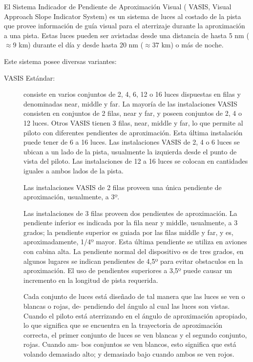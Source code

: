 El Sistema Indicador de Pendiente de Aproximación Visual ( VASIS, Visual
Approach Slope Indicator System) es un sistema de luces al costado de la pista que provee información
de guía visual para el aterrizaje durante la aproximación a una pista. Estas luces pueden ser avistadas
desde una distancia de hasta 5 nm ($\approx  9$ km) durante el día y desde hasta 20 nm ($\approx  37$ km) o más
de noche.

Este sistema posee diversas variantes:

\begin{description}

\item[VASIS Estándar:] consiste en varios conjuntos de 2, 4, 6, 12 o 16 luces dispuestas en filas y
denominadas near, middle y far. La mayoría de las instalaciones VASIS consisten en conjuntos
de 2 filas, near y far, y poseen conjuntos de 2, 4 o 12 luces. Otros VASIS tienen 3 filas, near,
middle y far, lo que permite al piloto con diferentes pendientes de aproximación. Esta última
instalación puede tener de 6 a 16 luces. Las instalaciones VASIS de 2, 4 o 6 luces se ubican a un
lado de la pista, usualmente la izquierda desde el punto de vista del piloto. Las instalaciones
de 12 a 16 luces se colocan en cantidades iguales a ambos lados de la pista.

Las instalaciones VASIS de 2 filas proveen una única pendiente de aproximación, usualmente,
a 3º.

Las instalaciones de 3 filas proveen dos pendientes de aproximación. La pendiente
inferior es indicada por la fila near y middle, usualmente, a 3 grados; la pendiente superior
es guiada por las filas middle y far, y es, aproximadamente, 1/4º mayor. Esta última
pendiente se utiliza en aviones con cabina alta. La pendiente normal del dispositivo es de tres
grados, en algunos lugares se indican pendientes de 4,5º para evitar obstaculos en la
aproximación. El uso de pendientes superiores a 3,5º puede causar un incremento en la
longitud de pista requerida.

Cada conjunto de luces está diseñado de tal manera que las luces se ven o blancas o rojas, de-
pendiendo del ángulo al cual las luces son vistas. Cuando el piloto está aterrizando en el ángulo
de aproximación apropiado, lo que significa que se encuentra en la trayectoria de aproximación
correcta, el primer conjunto de luces se ven blancas y el segundo conjunto, rojas. Cuando am-
bos conjuntos se ven blancos, esto significa que está volando demasiado alto; y demasiado bajo
cuando ambos se ven rojos.


\end{description}
